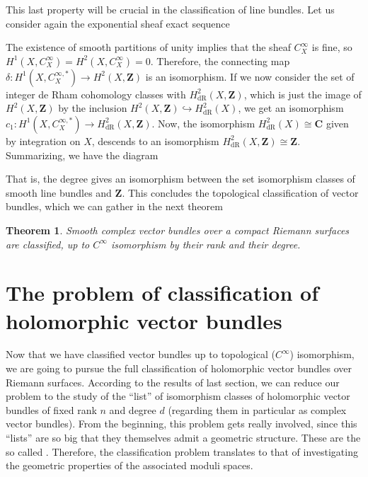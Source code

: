 \documentclass[12pt,a4paper]{book}
\newtheorem{thm}{Theorem}[section]
\theoremstyle{definition} \newtheorem{defn}[thm]{Definition}
\theoremstyle{definition} \newtheorem{ejemplo}[thm]{Example}
\theoremstyle{remark} \newtheorem{rem}[thm]{Remark}
\def\CC{\mathbf{C}}
\def\ZZ{\mathbf{Z}}
\let\emph\relax
\begin{document}
This last property will be crucial in the classification of line bundles. Let us consider again the exponential sheaf exact sequence
      \begin{center}
       \end{center}
       The existence of smooth partitions of unity implies that the sheaf $C^\infty_X$ is fine, so $H^1(X,C^\infty_X)=H^2(X,C^\infty_X)=0$. Therefore, the connecting map $\delta:H^1(X,C^{\infty,*}_X)\rightarrow H^2(X,\ZZ)$ is an isomorphism. If we now consider the set of integer de Rham cohomology classes with $H^2_{\mathrm{dR}}(X,\ZZ)$, which is just the image of $H^2(X,\ZZ)$ by the inclusion $H^2(X,\ZZ)\hookrightarrow H^2_{\mathrm{dR}}(X)$, we get an isomorphism $c_1:H^1(X,C_X^{\infty,*})\rightarrow H^2_{\mathrm{dR}}(X,\ZZ)$. Now, the isomorphism $H^2_{\mathrm{dR}}(X) \cong \CC$ given by integration on $X$, descends to an isomorphism $H^2_{\mathrm{dR}}(X,\ZZ) \cong \ZZ$.
    Summarizing, we have the diagram
       \begin{center}
       \end{center}
       That is, the degree gives an isomorphism between the set isomorphism classes of smooth line bundles and $\ZZ$. This concludes the topological classification of vector bundles, which we can gather in the next theorem
       \begin{thm}
	 Smooth complex vector bundles over a compact Riemann surfaces are classified, up to $C^\infty$ isomorphism by their rank and their degree.
       \end{thm}
  
       \section{The problem of classification of holomorphic vector bundles}
       Now that we have classified vector bundles up to topological ($C^\infty$) isomorphism, we are going to pursue the full classification of holomorphic vector bundles over Riemann surfaces. According to the results of last section, we can reduce our problem to the study of the ``list'' of isomorphism classes of holomorphic vector bundles of fixed rank $n$ and degree $d$ (regarding them in particular as complex vector bundles). From the beginning, this problem gets really involved, since this ``lists'' are so big that they themselves admit a geometric structure. These are the so called \emph{moduli spaces}. Therefore, the classification problem translates to that of investigating the geometric properties of the associated moduli spaces.
\end{document}
